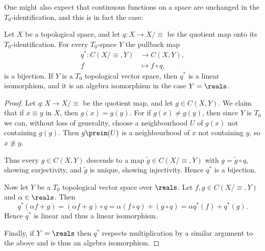 \documentclass[article, a4paper, 11pt, oneside]{memoir}
\numberwithin{equation}{chapter}
\begin{document}
One might also expect that continuous functions on a space are unchanged in the $T_0$-identification, and this is in fact the case:

\begin{proposition}
    \label{thm:T0-identification-continuous-functions}
    Let $X$ be a topological space, and let $q \colon X \to X/{\equiv}$ be the quotient map onto its $T_0$-identification. For every $T_0$-space $Y$ the pullback map
    \begin{align*}
        q^* \colon C(X/{\equiv},Y) &\to C(X,Y), \\
        f &\mapsto f \circ q,
    \end{align*}
    is a bijection. If $Y$ is a $T_0$ topological vector space\footnotemark, then $q^*$ is a linear isomorphism, and it is an algebra isomorphism in the case $Y = \reals$. %
\end{proposition}

\begin{proof}
    Let $q \colon X \to X/{\equiv}$ be the quotient map, and let $g \in C(X,Y)$. We claim that if $x \equiv y$ in $X$, then $g(x) = g(y)$. For if $g(x) \neq g(y)$, then since $Y$ is $T_0$ we can, without loss of generality, choose a neighbourhood $U$ of $g(x)$ not containing $g(y)$. Then $g\preim(U)$ is a neighbourhood of $x$ not containing $y$, so $x \not\equiv y$.

    Thus every $g \in C(X,Y)$ descends to a map $\tilde{g} \in C(X/{\equiv},Y)$ with $g = \tilde{g} \circ q$, showing surjectivity, and $\tilde{g}$ is unique, showing injectivity. Hence $q^*$ is a bijection.

    Now let $Y$ be a $T_0$ topological vector space over $\reals$. Let $f,g \in C(X/{\equiv},Y)$ and $\alpha \in \reals$. Then
    \begin{equation*}
        q^*(\alpha f + g)
            = (\alpha f + g) \circ q
            = \alpha (f \circ q) + (g \circ q)
            = \alpha q^*(f) + q^*(g).
    \end{equation*}
    Hence $q^*$ is linear and thus a linear isomorphism.

    Finally, if $Y = \reals$ then $q^*$ respects multiplication by a similar argument to the above and is thus an algebra isomorphism.
\end{proof}
\end{document}
